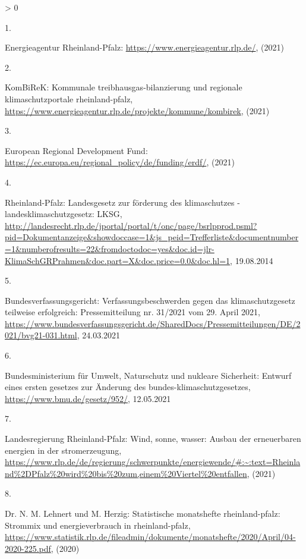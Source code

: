 \documentclass[a4paper,11pt]{article}
\newlength{\cslhangindent}
\newlength{\csllabelwidth}
\newenvironment{CSLReferences}[3] %
 {%
  \setlength{\parindent}{0pt}
  \ifodd #1 \everypar{\setlength{\hangindent}{\cslhangindent}}\ignorespaces\fi
  \ifnum #2 > 0
  \setlength{\parskip}{#2\baselineskip}
  \fi
 }%
 {}
\newcommand{\CSLLeftMargin}[1]{\parbox[t]{\maxof{\widthof{#1}}{\csllabelwidth}}{#1}}
\newcommand{\CSLRightInline}[1]{\parbox[t]{\linewidth}{#1}}
\begin{document}
\hypertarget{refs}{}
\begin{CSLReferences}{0}{0}
\leavevmode\hypertarget{ref-EnergieagenturRheinlandPfalz.2021}{}%
\CSLLeftMargin{1. }
\CSLRightInline{Energieagentur Rheinland-Pfalz: \url{https://www.energieagentur.rlp.de/}, (2021)}

\leavevmode\hypertarget{ref-KomBiReK.2021}{}%
\CSLLeftMargin{2. }
\CSLRightInline{KomBiReK: Kommunale treibhausgas-bilanzierung und regionale klimaschutzportale rheinland-pfalz, \url{https://www.energieagentur.rlp.de/projekte/kommune/kombirek}, (2021)}

\leavevmode\hypertarget{ref-EuropeanRegionalDevelopmentFund.2021}{}%
\CSLLeftMargin{3. }
\CSLRightInline{European Regional Development Fund: \url{https://ec.europa.eu/regional_policy/de/funding/erdf/}, (2021)}

\leavevmode\hypertarget{ref-RheinlandPfalz.19.08.2014}{}%
\CSLLeftMargin{4. }
\CSLRightInline{Rheinland-Pfalz: Landesgesetz zur f{ö}rderung des klimaschutzes - landesklimaschutzgesetz: LKSG, \url{http://landesrecht.rlp.de/jportal/portal/t/onc/page/bsrlpprod.psml?pid=Dokumentanzeige\&showdoccase=1\&js_peid=Trefferliste\&documentnumber=1\&numberofresults=22\&fromdoctodoc=yes\&doc.id=jlr-KlimaSchGRPrahmen\&doc.part=X\&doc.price=0.0\&doc.hl=1}, 19.08.2014}

\leavevmode\hypertarget{ref-Bundesverfassungsgericht.24.03.2021}{}%
\CSLLeftMargin{5. }
\CSLRightInline{Bundesverfassungsgericht: Verfassungsbeschwerden gegen das klimaschutzgesetz teilweise erfolgreich: Pressemitteilung nr. 31/2021 vom 29. April 2021, \url{https://www.bundesverfassungsgericht.de/SharedDocs/Pressemitteilungen/DE/2021/bvg21-031.html}, 24.03.2021}

\leavevmode\hypertarget{ref-BundesministeriumfurUmweltNaturschutzundnukleareSicherheit.12.05.2021}{}%
\CSLLeftMargin{6. }
\CSLRightInline{Bundesministerium für Umwelt, Naturschutz und nukleare Sicherheit: Entwurf eines ersten gesetzes zur {Ä}nderung des bundes-klimaschutzgesetzes, \url{https://www.bmu.de/gesetz/952/}, 12.05.2021}

\leavevmode\hypertarget{ref-LandesregierungRheinlandPfalz.2021}{}%
\CSLLeftMargin{7. }
\CSLRightInline{Landesregierung Rheinland-Pfalz: Wind, sonne, wasser: Ausbau der erneuerbaren energien in der stromerzeugung, \url{https://www.rlp.de/de/regierung/schwerpunkte/energiewende/\#:~:text=Rheinland\%2DPfalz\%20wird\%20bis\%20zum,einem\%20Viertel\%20entfallen}, (2021)}

\leavevmode\hypertarget{ref-Lehnert.2020}{}%
\CSLLeftMargin{8. }
\CSLRightInline{Dr. N. M. Lehnert und M. Herzig: Statistische monatshefte rheinland-pfalz: Strommix und energieverbrauch in rheinland-pfalz, \url{https://www.statistik.rlp.de/fileadmin/dokumente/monatshefte/2020/April/04-2020-225.pdf}, (2020)}


\end{CSLReferences}
\end{document}
